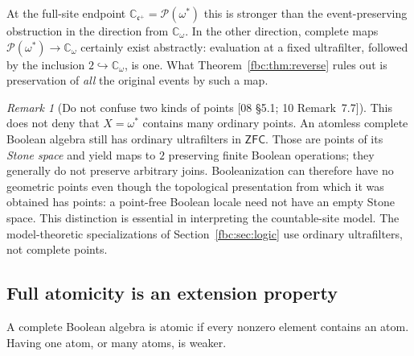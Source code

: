 \documentclass[11pt,letterpaper]{article}
\theoremstyle{definition}
\theoremstyle{remark}
\newtheorem{remark}[theorem]{Remark}
\newcommand{\om}{\omega}
\newcommand{\C}{\mathbb C}
\newcommand{\pow}{\mathcal P}
\newcommand{\cc}{\mathfrak c}
\newcommand{\ZFC}{\mathsf{ZFC}}
\newcommand{\src}[1]{\textup{[#1]}}
\begin{document}
At the full-site endpoint $\C_{\cc^+}=\pow(\om^*)$ this is stronger than
the event-preserving obstruction in the direction from $\C_\om$. In the
other direction, complete maps $\pow(\om^*)\to\C_\om$ certainly exist
abstractly: evaluation at a fixed ultrafilter, followed by the inclusion
$2\hookrightarrow\C_\om$, is one. What Theorem~\ref{fbc:thm:reverse}
rules out is preservation of \emph{all} the original events by such a
map.

\begin{remark}[Do not confuse two kinds of points \src{08 \S5.1; 10 Remark~7.7}]
\label{fbc:rem:two-points}
This does not deny that $X=\om^*$ contains many ordinary points.
An atomless complete Boolean algebra still has ordinary ultrafilters in
$\ZFC$. Those are points of its \emph{Stone space} and yield maps to $2$
preserving finite Boolean operations; they generally do not preserve
arbitrary joins. Booleanization can therefore have no geometric points
even though the topological presentation from which it was obtained has
points: a point-free Boolean locale need not have an empty Stone space.
This distinction is essential in interpreting the countable-site model.
The model-theoretic specializations of Section~\ref{fbc:sec:logic} use
ordinary ultrafilters, not complete points.
\end{remark}

\subsection{Full atomicity is an extension property}
A complete Boolean algebra is atomic if every nonzero element contains
an atom. Having one atom, or many atoms, is weaker.
\end{document}
